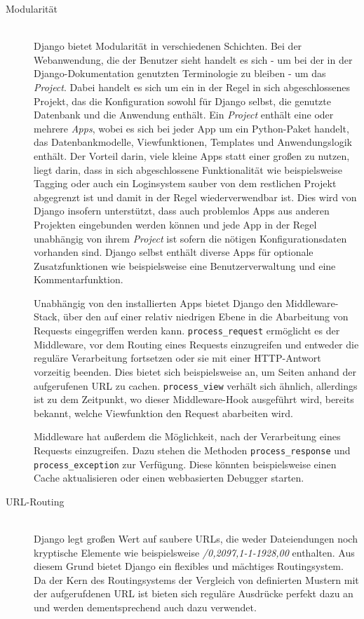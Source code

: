 \begin{description}
\item[Modularität] \hfill \\
Django bietet Modularität in verschiedenen Schichten. Bei der Webanwendung, die der Benutzer sieht
handelt es sich - um bei der in der Django-Dokumentation genutzten Terminologie zu bleiben - um das
\emph{Project}. Dabei handelt es sich um ein in der Regel in sich abgeschlossenes Projekt, das die
Konfiguration sowohl für Django selbst, die genutzte Datenbank und die Anwendung enthält. Ein
\emph{Project} enthält eine oder mehrere \emph{Apps}, wobei es sich bei jeder App um ein
Python-Paket handelt, das Datenbankmodelle, Viewfunktionen, Templates und Anwendungslogik enthält.
Der Vorteil darin, viele kleine Apps statt einer großen zu nutzen, liegt darin, dass in sich
abgeschlossene Funktionalität wie beispielsweise Tagging oder auch ein Loginsystem sauber von dem
restlichen Projekt abgegrenzt ist und damit in der Regel wiederverwendbar ist. Dies wird von Django
insofern unterstützt, dass auch problemlos Apps aus anderen Projekten eingebunden werden können und
jede App in der Regel unabhängig von ihrem \emph{Project} ist sofern die nötigen Konfigurationsdaten
vorhanden sind. Django selbst enthält diverse Apps für optionale Zusatzfunktionen wie beispielsweise
eine Benutzerverwaltung und eine Kommentarfunktion.

Unabhängig von den installierten Apps bietet Django den Middleware-Stack, über den auf einer relativ
niedrigen Ebene in die Abarbeitung von Requests eingegriffen werden kann.
\lstinline{process_request} ermöglicht es der Middleware, vor dem Routing eines Requests
einzugreifen und entweder die reguläre Verarbeitung fortsetzen oder sie mit einer HTTP-Antwort
vorzeitig beenden. Dies bietet sich beispielsweise an, um Seiten anhand der aufgerufenen URL zu
cachen. \lstinline{process_view} verhält sich ähnlich, allerdings ist zu dem Zeitpunkt, wo dieser
Middleware-Hook ausgeführt wird, bereits bekannt, welche Viewfunktion den Request abarbeiten wird.

Middleware hat außerdem die Möglichkeit, nach der Verarbeitung eines Requests einzugreifen. Dazu
stehen die Methoden \lstinline{process_response} und \lstinline{process_exception} zur Verfügung.
Diese könnten beispielsweise einen Cache aktualisieren oder einen webbasierten Debugger starten.


\item[URL-Routing] \hfill \\
Django legt großen Wert auf saubere URLs, die weder Dateiendungen noch kryptische Elemente wie
beispielsweise \emph{/0,2097,1-1-1928,00} enthalten. Aus diesem Grund bietet Django ein flexibles
und mächtiges Routingsystem. Da der Kern des Routingsystems der Vergleich von definierten Mustern
mit der aufgerufdenen URL ist bieten sich reguläre Ausdrücke perfekt dazu an und werden
dementsprechend auch dazu verwendet.


\end{description}
